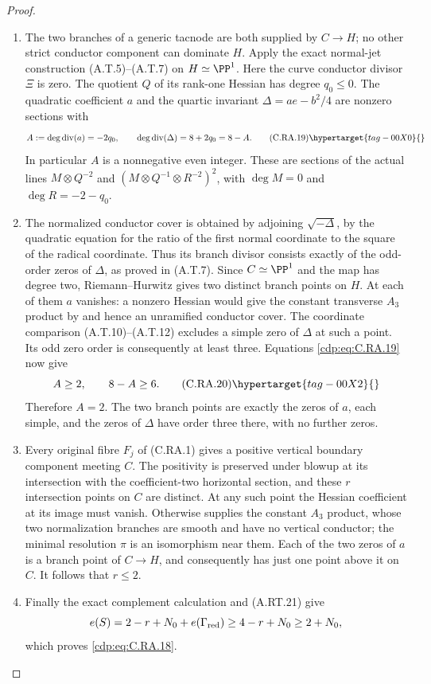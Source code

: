 \begin{proof}

\begin{enumerate}[label={$\langle1\rangle$\arabic*.},leftmargin=*]
\item The two branches of a generic tacnode are both supplied by
$C\to H$; no other strict conductor component can dominate $H$.
Apply the exact normal-jet construction (A.T.5)--(A.T.7) on
$H\simeq\PP^1$. Here the curve conductor divisor $\Xi$ is zero.
The quotient $Q$ of its rank-one Hessian has degree $q_0\le0$.
The quadratic coefficient $a$ and the quartic invariant
$\Delta=ae-b^2/4$ are nonzero sections with
\[
 A:=\deg\operatorname{div}(a)=-2q_0,\qquad
 \deg\operatorname{div}(\Delta)=8+2q_0=8-A.
\tag{C.RA.19}\hypertarget{tag-00X0}{}\label{cdp:eq:C.RA.19}
\]
In particular $A$ is a nonnegative even integer. These are
sections of the actual lines $M\otimes Q^{-2}$ and
$(M\otimes Q^{-1}\otimes R^{-2})^2$, with
$\deg M=0$ and $\deg R=-2-q_0$.

\item The normalized conductor cover is obtained by adjoining
$\sqrt{-\Delta}$, by the quadratic equation for the ratio of
the first normal coordinate to the square of the radical
coordinate. Thus its branch divisor consists exactly of the
odd-order zeros of $\Delta$, as proved in (A.T.7). Since
$C\simeq\PP^1$ and the map has degree two, Riemann--Hurwitz
gives two distinct branch points on $H$. At each of them
$a$ vanishes: a nonzero Hessian would give the constant
transverse $A_3$ product by  and hence an unramified
conductor cover. The coordinate comparison
(A.T.10)--(A.T.12) excludes a simple zero of $\Delta$ at
such a point. Its odd zero order is consequently at least
three. Equations \eqref{cdp:eq:C.RA.19} now give
\[
                        A\ge2,\qquad 8-A\ge6.
\tag{C.RA.20}\hypertarget{tag-00X2}{}\label{cdp:eq:C.RA.20}
\]
Therefore $A=2$. The two branch points are exactly the
zeros of $a$, each simple, and the zeros of $\Delta$ have
order three there, with no further zeros.

\item Every original fibre $F_j$ of (C.RA.1) gives a positive
vertical boundary component meeting $C$. The positivity
is preserved under blowup at its intersection with the
coefficient-two horizontal section, and these $r$
intersection points on $C$ are distinct. At any such point
the Hessian coefficient at its image must vanish. Otherwise
 supplies the constant $A_3$ product, whose two
normalization branches are smooth and have no vertical
conductor; the minimal resolution $\pi$ is an isomorphism
near them. Each of the two zeros of $a$ is a branch point
of $C\to H$, and consequently has just one point above it
on $C$. It follows that $r\le2$.

\item Finally the exact complement calculation and (A.RT.21) give
\[
 e(S)=2-r+N_0+e(\Gamma_{\rm red})
                  \ge4-r+N_0\ge2+N_0,
\]
which proves \eqref{cdp:eq:C.RA.18}.

\end{enumerate}
\end{proof}
